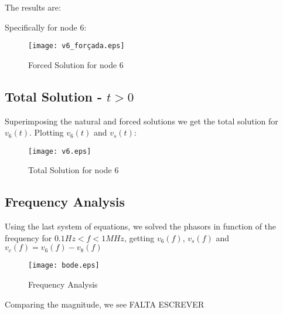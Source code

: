 The results are:



Specifically for node 6:

\begin{figure}[h] \centering
\texttt{[image: v6\_forçada.eps]}
\caption{Forced Solution for node 6}
\label{fig:forced}
\end{figure}



\subsection{Total Solution - $t>0$}

Superimposing the natural and forced solutions we get the total solution for $v_{6}(t)$.
Plotting $v_{6}(t)$ and $v_{s}(t)$:

\begin{figure}[h] \centering
\texttt{[image: v6.eps]}
\caption{Total Solution for node 6}
\label{fig:total}
\end{figure}


\subsection{Frequency Analysis}

Using the last system of equations, we solved the phasors in function of the frequency for $0.1Hz<f<1MHz$, getting $v_{6}(f)$, $v_{s}(f)$ and $v_{c}(f)=v_{6}(f)-v_{8}(f)$

\begin{figure}[h] \centering
\texttt{[image: bode.eps]}
\caption{Frequency Analysis}
\label{fig:frequency}
\end{figure}

Comparing the magnitude, we see FALTA ESCREVER

